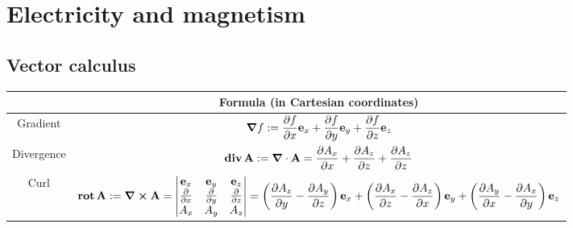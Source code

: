 \documentclass[../../../main_physics.tex]{subfiles}
\begin{document}
\renewcommand{\col}{\phy}
\section{Electricity and magnetism}
\subsection{Vector calculus}
\begin{center}
  \begin{tabular}{|c|c|}

    \hline
               & Formula (in Cartesian coordinates)                                                                                                                                                                                                                                                                                             \\
    \hline
    Gradient   & $\displaystyle\grad f:=\frac{\partial f}{\partial x}\boldsymbol{\mathrm{e}}_x+\frac{\partial f}{\partial y}\boldsymbol{\mathrm{e}}_y+\frac{\partial f}{\partial z}\boldsymbol{\mathrm{e}}_z$                                                                                                                                                                                      \\
    \hline
    Divergence & $\displaystyle\operatorname{\boldsymbol{\mathrm{div}}} \boldsymbol{\mathrm{A}}:=\grad\cdot\boldsymbol{\mathrm{A}}=\frac{\partial A_x}{\partial x}+\frac{\partial A_z}{\partial z}+\frac{\partial A_z}{\partial z}$                                                                                                                                                                                   \\
    \hline
    Curl       & $\displaystyle\rot \vf{A}:=\grad\crossprod\vf{A}=\begin{vmatrix}
                                                                      \vf{e}_x                    & \vf{e}_y                    & \vf{e}_z                    \\
                                                                      \frac{\partial}{\partial x} & \frac{\partial}{\partial y} & \frac{\partial}{\partial z} \\
                                                                      A_x                         & A_y                         & A_z                         \\
                                                                    \end{vmatrix}=\left(\frac{\partial A_z}{\partial y}-\frac{\partial A_y}{\partial z}\right)\vf{e}_x+\left(\frac{\partial A_x}{\partial z}-\frac{\partial A_z}{\partial x}\right)\vf{e}_y+\left(\frac{\partial A_y}{\partial x}-\frac{\partial A_x}{\partial y}\right)\vf{e}_z$ \\

\end{tabular}
\end{center}
\end{document}

